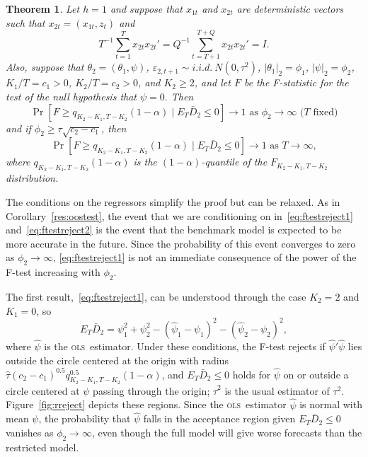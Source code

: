 \documentclass[11pt]{article}
\newtheorem{thm}{Theorem}[section]
\newcommand{\h}{h}
\newcommand{\ols}{\textsc{ols}}
\begin{document}
\begin{thm}\label{res:ftest}
  Let $\h = 1$ and suppose that $x_{1t}$ and $x_{2t}$ are
  deterministic vectors such that $x_{2t} = (x_{1t}, z_t)$ and
\[
T^{-1} \sum_{t=1}^T x_{2t} x_{2t}'  = Q^{-1} \sum_{t=T+1}^{T+Q} x_{2t} x_{2t}' =
I.
\]
Also, suppose that $\theta_2 = (\theta_1, \psi)$, 
$\varepsilon_{2,t+1} \sim i.i.d.\ N(0,\tau^2)$,
$|\theta_1|_2 = \phi_1$, $|\psi|_2 = \phi_2$, $K_1/T = c_1 > 0$,
$K_2/T = c_2 > 0$, and $K_2 \geq 2$, and let $F$ be the F-statistic
for the test of the null hypothesis that $\psi = 0.$
Then 
\begin{equation}\label{eq:ftestreject1}
  \Pr[F \geq q_{K_2 - K_1, T - K_2}(1-\alpha) \mid E_T \bar{D}_2 \leq 0
  ] \to 1\mbox{ as $\phi_2 \to \infty$ ($T$ fixed)}
\end{equation}
and if $\phi_2 \geq \tau \sqrt{c_2 - c_1}$, then
\begin{equation}\label{eq:ftestreject2}
  \Pr[F \geq q_{K_2 - K_1, T - K_2}(1-\alpha) \mid E_T \bar{D}_2 \leq 0
  ] \to 1 \text{ as $T \to \infty$},
\end{equation}
where $q_{K_2-K_1, T-K_2}(1-\alpha)$ is the
$(1-\alpha)$-quantile of the $F_{K_2-K_1, T-K_2}$ distribution.
\end{thm}
The conditions on the regressors simplify the proof but can be
relaxed.  As in Corollary~\ref{res:oostest}, the event that we are
conditioning on in~\eqref{eq:ftestreject1} and~\eqref{eq:ftestreject2}
is the event that the benchmark model is expected to be more accurate
in the future.  Since the probability of this event converges to zero
as $\phi_2 \to \infty$, \eqref{eq:ftestreject1} is not an immediate
consequence of the power of the F-test increasing with $\phi_2$.

The first result,~\eqref{eq:ftestreject1}, can be understood through the case $K_2 = 2$ and
$K_1 = 0$, so
\begin{equation*}
  E_T \bar D_2 = \psi_1^2 + \psi_2^2 - (\hat{\psi}_1 - \psi_1)^2 - (\hat\psi_2 - \psi_2)^2,
\end{equation*}
where $\hat{\psi}$ is the \ols\ estimator.  Under these conditions,
the F-test rejects if $\hat{\psi}'\hat{\psi}$ lies outside the circle
centered at the origin with radius $\hat{\tau} (c_2 - c_1)^{0.5}
q_{K_2-K_1, T-K_2}^{0.5}(1-\alpha)$, and $E_T \bar{D}_2 \leq 0$ holds
for $\hat\psi$ on or outside a circle centered at $\psi$ passing
through the origin; $\hat{\tau}^2$ is the usual estimator of $\tau^2$.
Figure~\ref{fig:rreject} depicts these regions.  Since the \ols\
estimator $\hat\psi$ is normal with mean $\psi$, the probability that
$\hat{\psi}$ falls in the acceptance region given $E_T \bar{D}_2 \leq
0$ vanishes as $\phi_2 \to \infty$, even though the full model will
give worse forecasts than the restricted model.
\end{document}
